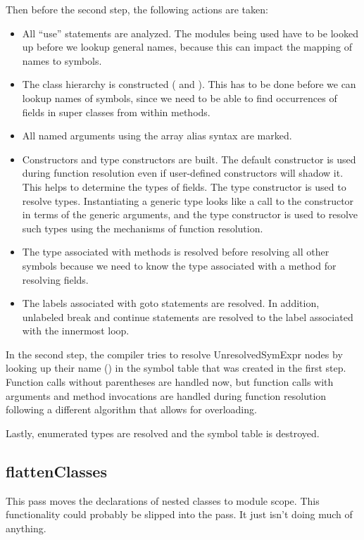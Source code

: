 \documentclass[10pt]{article}
\begin{document}
Then before the second step, the following actions are taken:
\begin{itemize}
\item All ``use'' statements are analyzed.  The modules being used
  have to be looked up before we lookup general names, because this
  can impact the mapping of names to symbols.
\item The class hierarchy is constructed ( and
  ).  This has to be done before we can lookup
  names of symbols, since we need to be able to find occurrences of
  fields in super classes from within methods.
\item All named arguments using the array alias syntax are marked.
\item Constructors and type constructors are built.  The default
  constructor is used during function resolution even if user-defined
  constructors will shadow it.  This helps to determine the types of
  fields.  The type constructor is used to resolve types.
  Instantiating a generic type looks like a call to the constructor in
  terms of the generic arguments, and the type constructor is used to
  resolve such types using the mechanisms of function resolution.
\item The type associated with methods is resolved before resolving
  all other symbols because we need to know the type associated with a
  method for resolving fields.
\item The labels associated with goto statements are resolved.  In
  addition, unlabeled break and continue statements are resolved to
  the label associated with the innermost loop.
\end{itemize}

In the second step, the compiler tries to resolve UnresolvedSymExpr
nodes by looking up their name () in the symbol table
that was created in the first step.  Function calls without
parentheses are handled now, but function calls with arguments and
method invocations are handled during function resolution following a
different algorithm that allows for overloading.

Lastly, enumerated types are resolved and the symbol table is
destroyed.

\subsection{flattenClasses}

This pass moves the declarations of nested classes to module scope.
This functionality could probably be slipped into the 
pass.  It just isn't doing much of anything.
\end{document}
